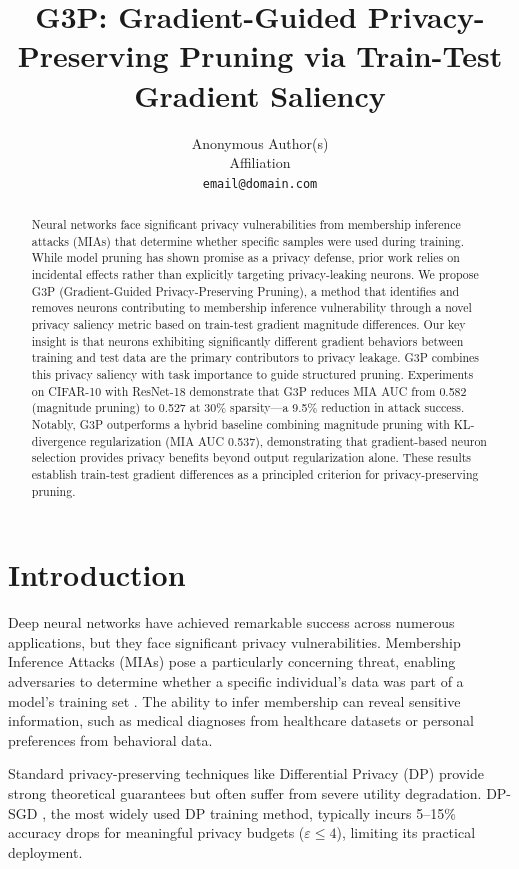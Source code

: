 \documentclass[11pt]{article}
\title{\textbf{G3P: Gradient-Guided Privacy-Preserving Pruning via Train-Test Gradient Saliency}}
\author{%
  Anonymous Author(s) \\
  Affiliation \\
  \texttt{email@domain.com}
}
\date{}
\begin{document}
\maketitle

\begin{abstract}
\noindent Neural networks face significant privacy vulnerabilities from membership inference attacks (MIAs) that determine whether specific samples were used during training. While model pruning has shown promise as a privacy defense, prior work relies on incidental effects rather than explicitly targeting privacy-leaking neurons. We propose G3P (Gradient-Guided Privacy-Preserving Pruning), a method that identifies and removes neurons contributing to membership inference vulnerability through a novel privacy saliency metric based on train-test gradient magnitude differences. Our key insight is that neurons exhibiting significantly different gradient behaviors between training and test data are the primary contributors to privacy leakage. G3P combines this privacy saliency with task importance to guide structured pruning. Experiments on CIFAR-10 with ResNet-18 demonstrate that G3P reduces MIA AUC from 0.582 (magnitude pruning) to 0.527 at 30\% sparsity---a 9.5\% reduction in attack success. Notably, G3P outperforms a hybrid baseline combining magnitude pruning with KL-divergence regularization (MIA AUC 0.537), demonstrating that gradient-based neuron selection provides privacy benefits beyond output regularization alone. These results establish train-test gradient differences as a principled criterion for privacy-preserving pruning.
\end{abstract}

\section{Introduction}

Deep neural networks have achieved remarkable success across numerous applications, but they face significant privacy vulnerabilities. Membership Inference Attacks (MIAs) pose a particularly concerning threat, enabling adversaries to determine whether a specific individual's data was part of a model's training set \citep{shokri2017membership}. The ability to infer membership can reveal sensitive information, such as medical diagnoses from healthcare datasets or personal preferences from behavioral data.

Standard privacy-preserving techniques like Differential Privacy (DP) provide strong theoretical guarantees but often suffer from severe utility degradation. DP-SGD \citep{abadi2016deep}, the most widely used DP training method, typically incurs 5--15\% accuracy drops for meaningful privacy budgets ($\varepsilon \leq 4$), limiting its practical deployment.
\end{document}
